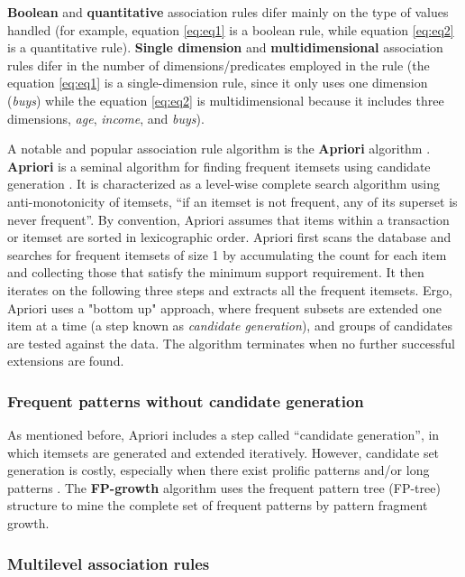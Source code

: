 \textbf{Boolean} and \textbf{quantitative} association rules difer mainly on the type of values handled (for example, equation \ref{eq:eq1} is a boolean rule, while equation \ref{eq:eq2} is a quantitative rule). \textbf{Single dimension} and \textbf{multidimensional} association rules difer in the number of dimensions/predicates employed in the rule (the equation \ref{eq:eq1} is a single-dimension rule, since it only uses one dimension (\textit{buys}) while the equation \ref{eq:eq2} is multidimensional because it includes three dimensions, \textit{age}, \textit{income}, and \textit{buys}). 

A notable and popular association rule algorithm is the \textbf{Apriori} algorithm \cite{wu2008top}. \textbf{Apriori} is a seminal algorithm for finding frequent itemsets using candidate generation \cite{agrawal1994fast}. It is characterized as a level-wise complete search algorithm using anti-monotonicity of itemsets, “if an itemset is not frequent, any of its superset is never frequent”. By convention, Apriori assumes that items within a transaction or itemset are sorted in lexicographic order. Apriori first scans the database and searches for frequent itemsets of size 1 by accumulating the count for each item and collecting those that satisfy the minimum support requirement. It then iterates on the following three steps and extracts all the frequent itemsets. Ergo, Apriori uses a "bottom up" approach, where frequent subsets are extended one item at a time (a step known as \textit{candidate generation}), and groups of candidates are tested against the data. The algorithm terminates when no further successful extensions are found.

\subsubsection*{Frequent patterns without candidate generation} 
As mentioned before, Apriori includes a step called “candidate generation”, in which itemsets are generated and extended iteratively.  However, candidate set generation is costly, especially when there exist prolific patterns and/or long patterns \cite{han2000mining}. The \textbf{FP-growth} algorithm uses the frequent pattern tree (FP-tree) structure to mine the complete set of frequent patterns by pattern fragment growth. 

\subsubsection*{Multilevel association rules}

